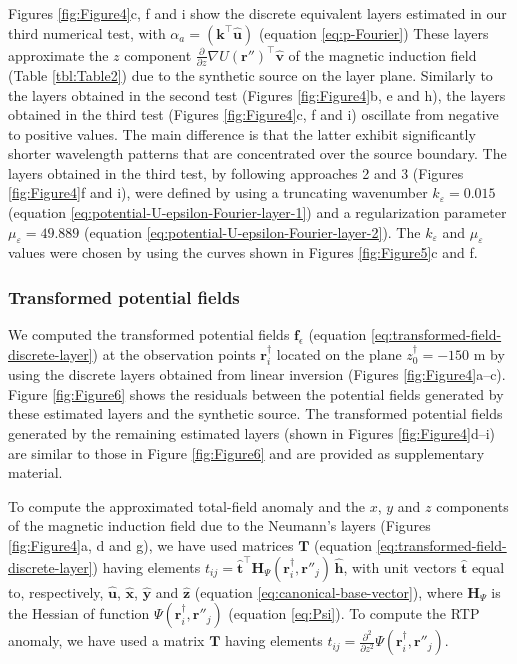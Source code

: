\documentclass[manuscript,noblind]{geophysics}
\begin{document}
	Figures \ref{fig:Figure4}c, f and i show the discrete equivalent layers estimated in our 
	third numerical test, with $\alpha_{a} = \left(\mathbf{k}^{\top} \hat{\mathbf{u}} \right)$ 
	(equation \ref{eq:p-Fourier}) 
	These layers approximate the $z$ component 
	$\frac{\partial}{\partial z}\nabla U(\mathbf{r}'')^{\top} \hat{\mathbf{v}}$
	of the magnetic induction field (Table \ref{tbl:Table2}) due to the synthetic source on the 
	layer plane.
	Similarly to the layers obtained in the second test (Figures \ref{fig:Figure4}b, e and h), 
	the layers obtained in the third test (Figures \ref{fig:Figure4}c, f and i) oscillate from
	negative to positive values. 
	The main difference is that the latter exhibit significantly shorter wavelength patterns that
	are concentrated over the source boundary.
	The layers obtained in the third test, by following approaches 2 and 3 
	(Figures \ref{fig:Figure4}f and i), were defined by using a truncating wavenumber 
	$k_{\varepsilon} = 0.015$ (equation \ref{eq:potential-U-epsilon-Fourier-layer-1})
	and a regularization parameter $\mu_{\varepsilon} = 49.889$ 
	(equation \ref{eq:potential-U-epsilon-Fourier-layer-2}). 
	The $k_{\varepsilon}$ and $\mu_{\varepsilon}$ values were chosen by using the curves shown 
	in Figures \ref{fig:Figure5}c and f.
	
	\subsubsection{Transformed potential fields}
	
	We computed the transformed potential fields $\mathbf{f}_{\epsilon}$ (equation \ref{eq:transformed-field-discrete-layer}) 
	at the observation points $\mathbf{r}^{\dagger}_{i}$ located on the plane $z^{\dagger}_{0} = -150$ m by using the discrete 
	layers obtained from linear inversion (Figures \ref{fig:Figure4}a–c). Figure \ref{fig:Figure6} shows the residuals 
	between the potential fields generated by these estimated layers and the synthetic source. The transformed potential 
	fields generated by the remaining estimated layers (shown in Figures \ref{fig:Figure4}d–i) are similar to those in Figure 
	\ref{fig:Figure6} and are provided as supplementary material.
	
	To compute the approximated total-field anomaly and the $x$, $y$ and $z$ components of the magnetic induction field 
	due to the Neumann's layers (Figures \ref{fig:Figure4}a, d and g), 
	we have used matrices $\mathbf{T}$ (equation \ref{eq:transformed-field-discrete-layer}) 
	having elements $t_{ij} = \hat{\mathbf{t}}^{\top} \mathbf{H}_{\Psi}(\mathbf{r}^{\dagger}_{i}, \mathbf{r}''_{j}) \, \hat{\mathbf{h}}$,
	with unit vectors $\hat{\mathbf{t}}$ equal to, respectively, $\hat{\mathbf{u}}$, $\hat{\mathbf{x}}$, $\hat{\mathbf{y}}$ and
	$\hat{\mathbf{z}}$ (equation \ref{eq:canonical-base-vector}), 
	where $\mathbf{H}_{\Psi}$ is the Hessian of function $\Psi(\mathbf{r}^{\dagger}_{i}, \mathbf{r}''_{j})$
	(equation \ref{eq:Psi}).
	To compute the RTP anomaly, we have used a matrix $\mathbf{T}$ 
	having elements $t_{ij} = \tfrac{\partial^{2}}{\partial z^{2}} \Psi(\mathbf{r}^{\dagger}_{i}, \mathbf{r}''_{j})$.
	
\end{document}
